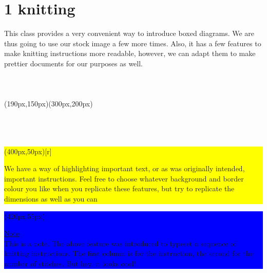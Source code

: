 \documentclass[a4paper,10pt]{article}
\title{}
\author{\huge Sonkamble.Amrapali\\
cse-c5\\
\huge b191741\\}
\begin{document}
\maketitle
\section{\huge{1 knitting}}
This class provides a very convenient way to introduce boxed diagrams. We are thus going to use our stock image a few more
times. Also, it has a few features to make knitting instructions more readable, however, we can adapt them to make prettier
documents for our purposes as well.\\\\\\\\
\framebox(190px,150px){\framebox(300px,200px){}}\\\\\\\\
\colorbox{yellow}{\framebox(400px,50px)[r]{\parbox[r]{400px}{We have a way of highlighting important text, or as was originally intended, important
instructions. Feel free to choose whatever background and border colour you like when
you replicate these features, but try to replicate the dimensions as well as you can}}}
\colorbox{blue}{\framebox(420px,55px)
{{\parbox[r]{400px}{\underline {\huge{Note}}\\
This is a note. The above feature was introduced to typeset a sequence of knitting instructions.
The first column is for the instruction, the second for the number of stitches. But hey, it looks
cool!}}}}
\end{document}
